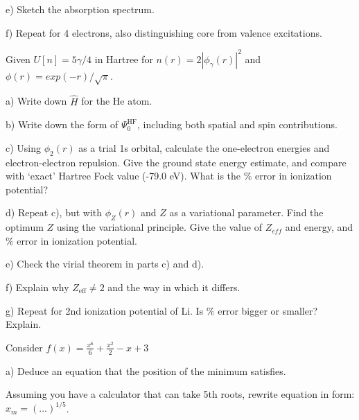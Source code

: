 e) Sketch the absorption spectrum.

f) Repeat for 4 electrons, also distinguishing core from valence excitations.

\newpage
{}
Given $U[n]=5\gamma/4$ in Hartree for $n(r) = 2|\phi_\gamma (r)|^2$ and
$\phi(r)=exp(-r)/{\sqrt{\pi}}$.

a) Write down $\hat{H}$ for the He atom.

b) Write down the form of $\Psi_0^{\text{HF}}$, including both spatial
and spin contributions.

c) Using $\phi_2(r)$ as a trial 1s orbital, calculate the one-electron
energies and electron-electron repulsion. Give the ground state energy
estimate, and compare with `exact' Hartree Fock value (-79.0 eV). What is the $\%$
error in ionization potential?

d) Repeat c), but with $\phi_Z(r)$ and $Z$ as a variational parameter.
Find the optimum $Z$ using the variational principle. Give the value
of $Z_{eff}$ and energy, and $\%$ error in ionization potential.

e) Check the virial theorem in parts c) and d).

f) Explain why $Z_{\text{eff}} \neq 2$ and the way in which it differs.

g) Repeat for 2nd ionization potential of Li. Is $\%$ error bigger or
smaller? Explain.

\newpage
%
%
%
%
%
{}
Consider $f(x) = \frac{x^6}{6} + \frac{x^2}{2} - x + 3$

a) Deduce an equation that the position of the minimum satisfies.

Assuming you have a calculator that can take 5th roots, rewrite equation
in form: $x_m = (...)^{1/5}$.

